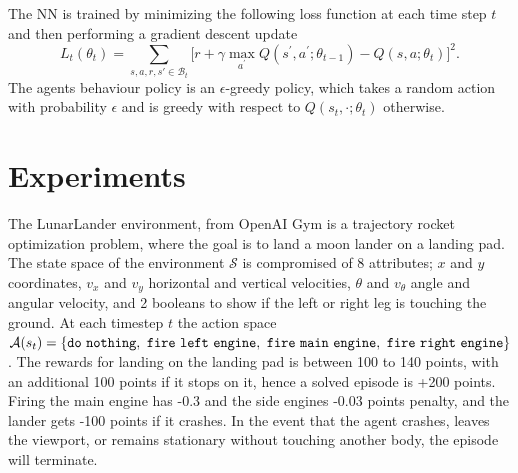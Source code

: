 \documentclass{article}
\newcommand{\cS}{\mathcal{S}}
\newcommand{\cA}{\mathcal{A}}
\newcommand{\cB}{\mathcal{B}}
\begin{document}
The NN is trained by minimizing the following loss function at each time step $t$ and then performing a gradient descent update
$$L_t(\theta_t) = \sum_{s, a, r, s' \in \cB_t}\big[r + \gamma \max_{a^\prime}Q(s^\prime, a^\prime; \theta_{t-1}) - Q(s, a; \theta_t)\big]^2.$$
The agents behaviour policy is an $\epsilon$-greedy policy, which takes a random action with probability $\epsilon$ and is greedy with respect to $Q(s_t, \cdot; \theta_t)$ otherwise.



\section{Experiments} \label{sec:experiments}
The LunarLander environment, from OpenAI Gym \cite[]{brockman2016gym} is a trajectory rocket optimization problem, where the goal is to land a moon lander on a landing pad.
The state space of the environment $\cS$ is compromised of 8 attributes; $x$ and $y$ coordinates, $v_x$ and $v_y$ horizontal and vertical velocities, $\theta$ and $v_\theta$ angle and angular velocity, and 2 booleans to show if the left or right leg is touching the ground. At each timestep $t$ the action space $\cA(s_t) = \tt\{do\ nothing,\ fire\ left\ engine,\ fire\ main\ engine,\ fire\ right\ engine\}$. The rewards for landing on the landing pad is between 100 to 140 points, with an additional 100 points if it stops on it, hence a solved episode is +200 points. Firing the main engine has -0.3 and the side engines -0.03 points penalty, and the lander gets -100 points if it crashes. In the event that the agent crashes, leaves the viewport, or remains stationary without touching another body, the episode will terminate.
\end{document}
